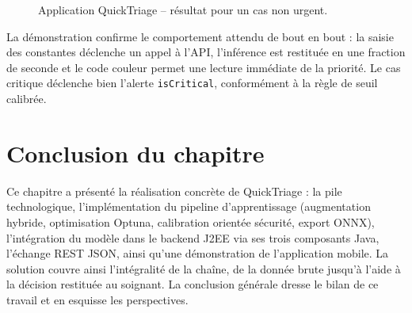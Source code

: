 \begin{figure}[h]
\centering
\caption{Application QuickTriage -- résultat pour un cas non urgent.}
\label{fig:demo-nonurgent}
\end{figure}

\noindent La démonstration confirme le comportement attendu de bout en bout : la saisie des
constantes déclenche un appel à l'API, l'inférence est restituée en une fraction de seconde et le
code couleur permet une lecture immédiate de la priorité. Le cas critique déclenche bien l'alerte
\texttt{isCritical}, conformément à la règle de seuil calibrée.

\section*{Conclusion du chapitre}
Ce chapitre a présenté la réalisation concrète de QuickTriage : la pile technologique,
l'implémentation du pipeline d'apprentissage (augmentation hybride, optimisation Optuna,
calibration orientée sécurité, export ONNX), l'intégration du modèle dans le backend J2EE via ses
trois composants Java, l'échange REST JSON, ainsi qu'une démonstration de l'application mobile. La
solution couvre ainsi l'intégralité de la chaîne, de la donnée brute jusqu'à l'aide à la décision
restituée au soignant. La conclusion générale dresse le bilan de ce travail et en esquisse les
perspectives.
